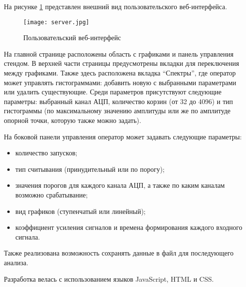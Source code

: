 На рисунке \ref{fig:server} представлен внешний вид пользовательского веб-интерфейса.\par
\begin{figure}[ht]
    \centering
    \texttt{[image: server.jpg]}
    \caption{Пользовательский веб-интерфейс}
    \label{fig:server}
\end{figure}
На главной странице расположены область с графиками и панель управления стендом. В верхней части страницы предусмотрены вкладки для переключения между графиками. Также здесь расположена вкладка ``Спектры'', где оператор может управлять гистограммами: добавить новую с выбранными параметрами или удалить существующие. Среди параметров присутствуют следующие параметры: выбранный канал АЦП, количество корзин (от 32 до 4096) и тип гистограммы (по максимальному значению амплитуды или же по амплитуде опорной точки, которую также можно задать).\par
На боковой панели управления оператор может задавать следующие параметры:\par
\begin{itemize}
    \item количество запусков;
    \item тип считывания (принудительный или по порогу);
    \item значения порогов для каждого канала АЦП, а также по каким каналам возможно срабатывание;
    \item вид графиков (ступенчатый или линейный);
    \item коэффициент усиления сигналов и времена формирования каждого входного сигнала.
\end{itemize}\par
Также реализована возможность сохранять данные в файл для последующего анализа.\par
Разработка велась с использованием языков JavaScript, HTML и CSS. \par
